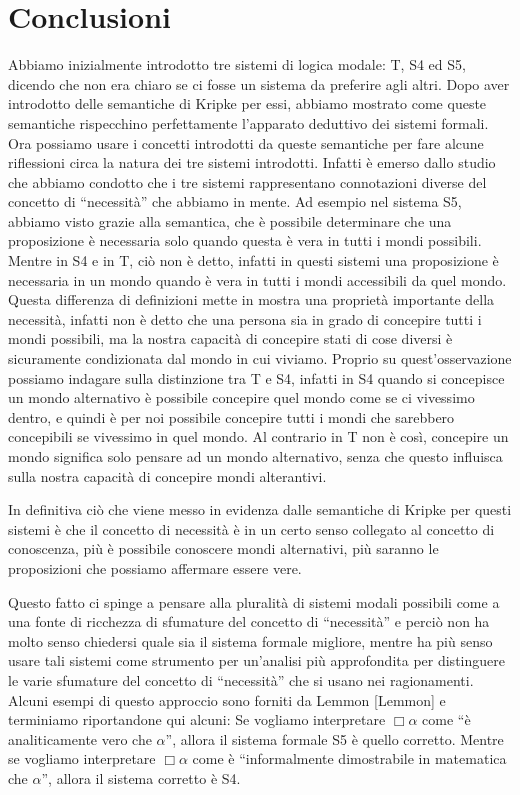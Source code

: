 \documentclass[a4paper, titlepage, 12pt]{report}
\begin{document}
\chapter*{Conclusioni}
Abbiamo inizialmente introdotto tre sistemi di logica modale: T, S4 ed S5,
dicendo che non era chiaro se ci fosse un sistema da preferire agli altri.
Dopo aver introdotto delle semantiche di Kripke per essi, abbiamo mostrato
come queste semantiche rispecchino perfettamente l'apparato deduttivo dei sistemi formali.
Ora possiamo usare i concetti introdotti da queste semantiche per fare alcune riflessioni
circa la natura dei tre sistemi introdotti. Infatti è emerso dallo studio che abbiamo condotto
che i tre sistemi rappresentano connotazioni diverse del concetto di ``necessità''
che abbiamo in mente.
Ad esempio nel sistema S5, abbiamo visto grazie alla semantica, che è possibile
determinare che una proposizione è necessaria solo quando questa è vera in tutti i mondi
possibili. Mentre in S4 e in T, ciò non è detto, infatti in questi sistemi una proposizione
è necessaria in un mondo quando è vera in tutti i mondi accessibili da quel mondo.
Questa differenza di definizioni mette in mostra una proprietà importante della necessità,
infatti non è detto che una persona sia in grado di concepire tutti i mondi possibili,
ma la nostra capacità di concepire stati di cose diversi è sicuramente condizionata dal mondo
in cui viviamo. Proprio su quest'osservazione possiamo indagare sulla distinzione tra T e S4,
infatti in S4 quando si concepisce un mondo alternativo è possibile concepire quel mondo
come se ci vivessimo dentro, e quindi è per noi possibile concepire tutti i mondi che sarebbero
concepibili se vivessimo in quel mondo. Al contrario in T non è così, concepire un mondo
significa solo pensare ad un mondo alternativo, senza che questo influisca sulla nostra capacità
di concepire mondi alterantivi.

In definitiva ciò che viene messo in evidenza dalle semantiche di Kripke per questi sistemi è
che il concetto di necessità è in un certo senso collegato al concetto di conoscenza, più
è possibile conoscere mondi alternativi, più saranno le proposizioni che possiamo
affermare essere vere.

Questo fatto ci spinge a pensare alla pluralità di sistemi modali possibili
come a una fonte di ricchezza di sfumature del concetto di ``necessità'' e perciò non ha molto
senso chiedersi quale sia il sistema formale migliore, mentre ha più senso usare tali sistemi
come strumento per un'analisi più approfondita per distinguere le varie sfumature del concetto
di ``necessità'' che si usano nei ragionamenti.
Alcuni esempi di questo approccio sono forniti da Lemmon [Lemmon] e terminiamo riportandone qui alcuni:
Se vogliamo interpretare $\Box \alpha$ come ``è analiticamente vero che $\alpha$'', allora il sistema
formale S5 è quello corretto. Mentre se vogliamo interpretare $\Box \alpha$ come
è ``informalmente dimostrabile in matematica che $\alpha$'', allora il sistema corretto è S4.
\end{document}
